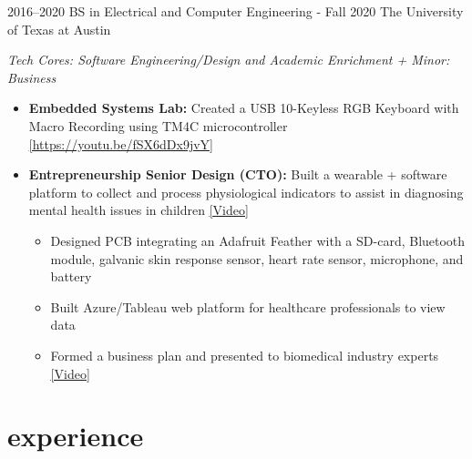 \documentclass[]{friggeri-cv} %
\begin{document}
\begin{entrylist}

	\entry
	{2016--2020}
	{BS in Electrical and Computer Engineering - Fall 2020}
	{The University of Texas at Austin}
	{
		\emph{Tech Cores: Software Engineering/Design and Academic Enrichment + 
		Minor: Business}
		\begin{itemize}
			\item \textbf{Embedded Systems Lab:} Created a USB 10-Keyless RGB Keyboard with Macro Recording using TM4C microcontroller \href{https://youtu.be/fSX6dDx9jvY}{\underline{[https://youtu.be/fSX6dDx9jvY]}}
			\item \textbf{Entrepreneurship Senior Design (CTO):} Built a wearable + software platform to collect and process physiological
			indicators to assist in diagnosing mental health issues in children \href{https://youtu.be/lP6gZINqRAU}{\underline{[Video]}}
			\begin{itemize}
				\item Designed PCB integrating an Adafruit Feather with a SD-card, Bluetooth module, galvanic skin response sensor, heart rate sensor, microphone, and battery
				\item Built Azure/Tableau web platform for healthcare professionals to view data
				\item Formed a business plan and presented to biomedical industry experts \href{https://youtu.be/n4y6X7Hgetc}{\underline{[Video]}}
			\end{itemize}
		\end{itemize}
	}
	
\end{entrylist}


\vspace{-5pt}
\vspace{-5pt}
\section{experience}
\vspace{-10pt}
\end{document}
